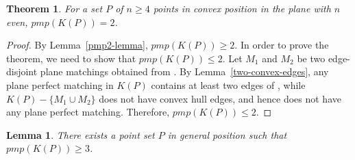 \documentclass[11pt,a4paper]{article}
\newcommand{\CH}[1]{\text{$CH(#1)$}}
\newcommand{\Kn}[1]{K#1}
\newtheorem{lemma}{Lemma}
\newtheorem{theorem}{Theorem}
\begin{document}
\begin{theorem}
For a set $P$ of $n\ge 4$ points in convex position in the plane with $n$ even, $pmp(\Kn{(P)})=2$.
\end{theorem}
\begin{proof}
By Lemma~\ref{pmp2-lemma}, $pmp(\Kn{(P)})\ge2$. In order to prove the theorem, we need to show that $pmp(\Kn{(P)})\le2$. Let $M_1$ and $M_2$ be two edge-disjoint plane matchings obtained from \CH{P}. By Lemma~\ref{two-convex-edges}, any plane perfect matching in $\Kn{(P)}$ contains at least two edges of \CH{P}, while $\Kn{(P)}-\{M_1\cup M_2\}$ does not have convex hull edges, and hence does not have any plane perfect matching. Therefore, $pmp(\Kn{(P)})\le2$. 
\end{proof}


\begin{lemma}
There exists a point set $P$ in general position such that $pmp(K(P))\ge 3$.
\end{lemma}
\end{document}

